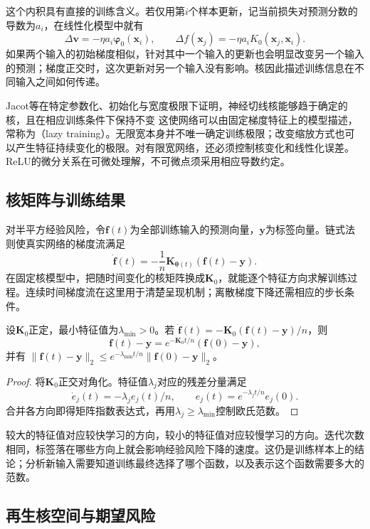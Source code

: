 这个内积具有直接的训练含义。若仅用第$i$个样本更新，记当前损失对预测分数的导数为$a_i$，在线性化模型中就有
\[
 \Delta\bm v=-\eta a_i\bm\varphi_0(\bm x_i),\qquad
 \Delta f(\bm x_j)=-\eta a_i K_0(\bm x_j,\bm x_i).
\]
如果两个输入的初始梯度相似，针对其中一个输入的更新也会明显改变另一个输入的预测；梯度正交时，这次更新对另一个输入没有影响。核因此描述训练信息在不同输入之间如何传递。

Jacot等在特定参数化、初始化与宽度极限下证明，神经切线核能够趋于确定的核，且在相应训练条件下保持不变 这使网络可以由固定梯度特征上的模型描述，常称为（lazy training）。无限宽本身并不唯一确定训练极限；改变缩放方式也可以产生特征持续变化的极限。对有限宽网络，还必须控制核变化和线性化误差。ReLU的微分关系在可微处理解，不可微点须采用相应导数约定。

\subsection{核矩阵与训练结果}

对半平方经验风险，令$\bm f(t)$为全部训练输入的预测向量，$\bm y$为标签向量。链式法则使真实网络的梯度流满足
\[
 \dot{\bm f}(t)=-\frac1n\bm K_{\bm\theta(t)}(\bm f(t)-\bm y).
\]
在固定核模型中，把随时间变化的核矩阵换成$\bm K_0$，就能逐个特征方向求解训练过程。连续时间梯度流在这里用于清楚呈现机制；离散梯度下降还需相应的步长条件。

\begin{theorem}[固定NTK下的训练收敛]
\label{thm:ntk-training-convergence}
设$\bm K_0$正定，最小特征值为$\lambda_{\min}>0$。若
$\dot{\bm f}(t)=-\bm K_0(\bm f(t)-\bm y)/n$，则
\[
 \bm f(t)-\bm y=e^{-\bm K_0t/n}(\bm f(0)-\bm y),
\]
并有
$\|\bm f(t)-\bm y\|_2\leq e^{-\lambda_{\min}t/n}\|\bm f(0)-\bm y\|_2$。
\end{theorem}
\begin{proof}
将$\bm K_0$正交对角化。特征值$\lambda_j$对应的残差分量满足
\[
 \dot e_j(t)=-\lambda_j e_j(t)/n,\qquad
 e_j(t)=e^{-\lambda_jt/n}e_j(0).
\]
合并各方向即得矩阵指数表达式，再用$\lambda_j\geq\lambda_{\min}$控制欧氏范数。
\end{proof}

较大的特征值对应较快学习的方向，较小的特征值对应较慢学习的方向。迭代次数相同，标签落在哪些方向上就会影响经验风险下降的速度。这仍是训练样本上的结论；分析新输入需要知道训练最终选择了哪个函数，以及表示这个函数需要多大的范数。

\subsection{再生核空间与期望风险}
\label{sec:ntk-rkhs-generalization}

